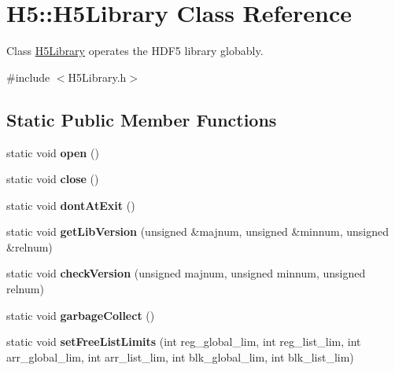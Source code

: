 \hypertarget{class_h5_1_1_h5_library}{}\section{H5\+:\+:H5\+Library Class Reference}
\label{class_h5_1_1_h5_library}


Class \hyperlink{class_h5_1_1_h5_library}{H5\+Library} operates the H\+D\+F5 library globably.  




{\ttfamily \#include $<$H5\+Library.\+h$>$}

\subsection*{Static Public Member Functions}
\begin{DoxyCompactItemize}
\item 
\mbox{\label{class_h5_1_1_h5_library_a2737e8d522bcf3c318b682a531e9d1c8}} 
static void {\bfseries open} ()
\item 
\mbox{\label{class_h5_1_1_h5_library_a31444dc0661822fbc891e5e8ab000d3b}} 
static void {\bfseries close} ()
\item 
\mbox{\label{class_h5_1_1_h5_library_a56dbd0c8eafa7a12d0f803407e6d032c}} 
static void {\bfseries dont\+At\+Exit} ()
\item 
\mbox{\label{class_h5_1_1_h5_library_a13a92c6934b43779abd1f1b55f17f15a}} 
static void {\bfseries get\+Lib\+Version} (unsigned \&majnum, unsigned \&minnum, unsigned \&relnum)
\item 
\mbox{\label{class_h5_1_1_h5_library_ad563a40fe51be7b2411b81c2360371fc}} 
static void {\bfseries check\+Version} (unsigned majnum, unsigned minnum, unsigned relnum)
\item 
\mbox{\label{class_h5_1_1_h5_library_a430390b75a266e560d74cc35d4dc3462}} 
static void {\bfseries garbage\+Collect} ()
\item 
\mbox{\label{class_h5_1_1_h5_library_a2f112441448671e3389e1d9bf8082b70}} 
static void {\bfseries set\+Free\+List\+Limits} (int reg\+\_\+global\+\_\+lim, int reg\+\_\+list\+\_\+lim, int arr\+\_\+global\+\_\+lim, int arr\+\_\+list\+\_\+lim, int blk\+\_\+global\+\_\+lim, int blk\+\_\+list\+\_\+lim)

\end{DoxyCompactItemize}
